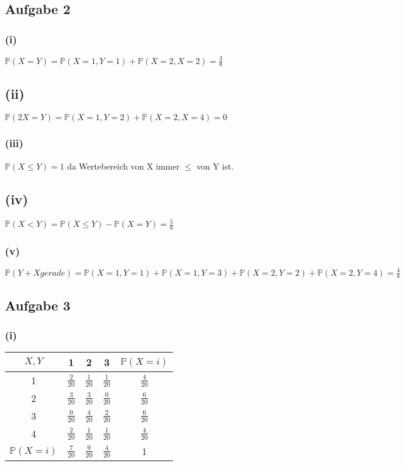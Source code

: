 \documentclass[a4paper,10pt]{article}
\title{}
\author{}
\newcommand{\wk}[1]{\ensuremath{\mathbb{P}(#1)}}
\begin{document}
\maketitle



\subsection{Aufgabe 2}
\subsubsection{(i)}
$\wk{X=Y} = \wk{X=1,Y=1} + \wk{X=2,X=2} = \frac{3}{8}$

\subsection{(ii)}
 $\wk{2X=Y} = \wk{X=1,Y=2} + \wk{X=2,X=4} = 0$

\subsubsection{(iii)}
$\wk{X \leq Y} = 1$ da Wertebereich von X immer $\leq$ von Y ist.

\subsection{(iv)}
$\wk{X < Y} = \wk{X \leq Y} - \wk{X=Y} = \frac{5}{8}$

\subsubsection{(v)}
$\wk{Y+X gerade} = \wk{X=1,Y=1} + \wk{X=1,Y=3} + \wk{X=2,Y=2} + \wk{X=2,Y=4} = \frac{4}{8}$

\subsection{Aufgabe 3}
\subsubsection{(i)}
\begin{center}
  \begin{tabular}{ c || c | c | c || c}
    $X,Y$ & 1              & 2              & 3               & $\wk{X = i}$ \\ \hline
    1     & $\frac{2}{20}$ & $\frac{1}{20}$ & $\frac{1}{20}$  & $\frac{4}{20}$ \\ \hline
    2     & $\frac{3}{20}$ & $\frac{3}{20}$ & $\frac{0}{20}$  & $\frac{6}{20}$ \\ \hline
    3     & $\frac{0}{20}$ & $\frac{4}{20}$ & $\frac{2}{20}$  & $\frac{6}{20}$ \\ \hline
    4     & $\frac{2}{20}$ & $\frac{1}{20}$ & $\frac{1}{20}$  & $\frac{4}{20}$ \\ \hline \hline
$\wk{X = i}$& $\frac{7}{20}$ & $\frac{9}{20}$ & $\frac{4}{20}$  &  1 \\
  \end{tabular}
\end{center}
\end{document}
